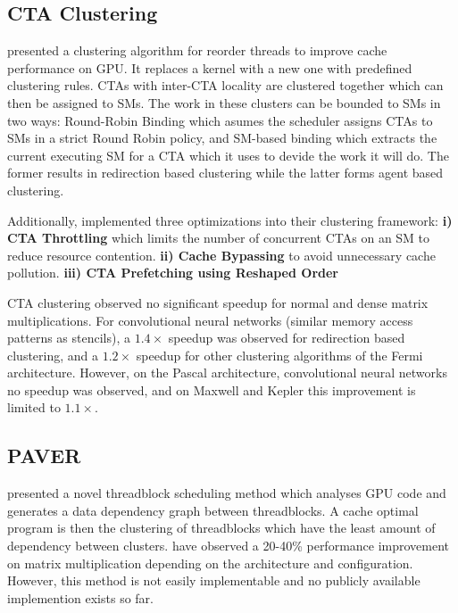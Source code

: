 \subsection{CTA Clustering}
\citet{li2017locality} presented a clustering algorithm for reorder threads to improve cache performance on GPU.
It replaces a kernel with a new one with predefined clustering rules.
CTAs with inter-CTA locality are clustered together which can then be assigned to SMs.
The work in these clusters can be bounded to SMs in two ways:
Round-Robin Binding which asumes the scheduler assigns CTAs to SMs in a strict Round Robin policy, and SM-based binding which extracts the current executing SM for a CTA which it uses to devide the work it will do.
The former results in redirection based clustering while the latter forms agent based clustering.

Additionally, \citeauthor{li2017locality} implemented three optimizations into their clustering framework: 
\textbf{i) CTA Throttling} which limits the number of concurrent CTAs on an SM to reduce resource contention.
\textbf{ii) Cache Bypassing} to avoid unnecessary cache pollution.
\textbf{iii) CTA Prefetching using Reshaped Order}

CTA clustering observed no significant speedup for normal and dense matrix multiplications.
For convolutional neural networks (similar memory access patterns as stencils), a $1.4\times$ speedup was observed for redirection based clustering, and a $1.2\times$ speedup for other clustering algorithms of the Fermi architecture.
However, on the Pascal architecture, convolutional neural networks no speedup was observed, and on Maxwell and Kepler this improvement is limited to $1.1\times$.

\subsection{PAVER}
\citet{tripathy2021paver} presented a novel threadblock scheduling method which analyses GPU code and generates a data dependency graph between threadblocks. 
A cache optimal program is then the clustering of threadblocks which have the least amount of dependency between clusters.
\citeauthor{tripathy2021paver} have observed a 20-40\% performance improvement on matrix multiplication depending on the architecture and configuration.
However, this method is not easily implementable and no publicly available implemention exists so far.
